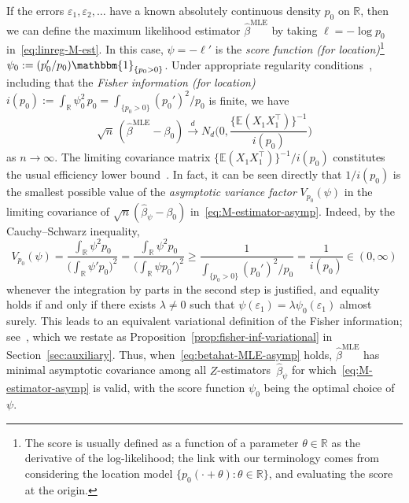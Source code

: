 \documentclass[a4paper]{article}
\newcommand{\R}{\mathbb{R}}
\newcommand{\E}{\mathbb{E}}
\newcommand{\Ind}{\mathbbm{1}}
\newcommand{\cvd}{\overset{d}{\to}}
\theoremstyle{definition}
\begin{document}
If the errors $\varepsilon_1,\varepsilon_2,\dotsc$ have a known absolutely continuous density $p_0$ on $\R$, then we can define the maximum likelihood estimator $\hat{\beta}^{\mathrm{MLE}}$ by taking $\ell = -\log p_0$ in~\eqref{eq:linreg-M-est}. In this case, $\psi = -\ell'$ is the \emph{score function (for location)}\footnote{The score is usually defined as a function of a parameter $\theta \in \R$ as the derivative of the log-likelihood; the link with our terminology comes from considering the location model $\{p_0(\cdot + \theta):\theta \in \mathbb{R}\}$, and evaluating the score at the origin.} $\psi_0 := (p_0'/p_0)\Ind_{\{p_0 > 0\}}$.  Under appropriate regularity conditions~\citep[e.g.][Theorem~5.39]{vdV1998asymptotic}, including that the \emph{Fisher information (for location)} $i(p_0) := \int_\R \psi_0^2\,p_0 = \int_{\{p_0 > 0\}}(p_0')^2/p_0$ is finite, we have
\begin{equation}
\label{eq:betahat-MLE-asymp}
\sqrt{n}\,(\hat{\beta}^{\mathrm{MLE}} - \beta_0) \cvd N_d\biggl(0, \frac{\{\E(X_1 X_1^\top)\}^{-1}}{i(p_0)}\biggr)
\end{equation}
as $n \to \infty$. The limiting covariance matrix $\{\E(X_1 X_1^\top)\}^{-1}/i(p_0)$ constitutes the usual efficiency lower bound~\citep[Chapter~8]{vdV1998asymptotic}. In fact, it can be seen directly that $1/i(p_0)$ is the smallest possible value of the \textit{asymptotic variance factor} $V_{p_0}(\psi)$ in the limiting covariance of $\sqrt{n}(\hat{\beta}_\psi - \beta_0)$ in~\eqref{eq:M-estimator-asymp}. Indeed, by the Cauchy--Schwarz inequality,
\begin{equation}
\label{eq:Vp0-Fisher}
V_{p_0}(\psi) = \frac{\int_\R\psi^2 p_0}{\bigl(\int_\R \psi' p_0\bigr)^2} = \frac{\int_\R\psi^2 p_0}{\bigl(\int_\R \psi p_0'\bigr)^2} \geq \frac{1}{\int_{\{p_0 > 0\}}(p_0')^2/p_0} = \frac{1}{i(p_0)} \in (0,\infty)
\end{equation}
whenever the integration by parts in the second step is justified, and equality holds if and only if there exists $\lambda \neq 0$ such that $\psi(\varepsilon_1) = \lambda\psi_0(\varepsilon_1)$ almost surely. This leads to an equivalent variational definition of the Fisher information; see~\citet[][Theorem~4.2]{huber2009robust}, which we restate as Proposition~\ref{prop:fisher-inf-variational} in Section~\ref{sec:auxiliary}. Thus, when~\eqref{eq:betahat-MLE-asymp} holds, $\hat{\beta}^{\mathrm{MLE}}$ has minimal asymptotic covariance among all $Z$-estimators~$\hat{\beta}_\psi$ for which~\eqref{eq:M-estimator-asymp} is valid, with the score function $\psi_0$ being the optimal choice of $\psi$.
\end{document}
